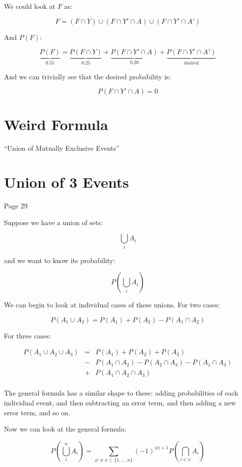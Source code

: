 \documentclass{article}
\begin{document}
We could look at $F$ as:

\[
F=(F\cap Y)\cup(F\cap Y'\cap A)\cup(F\cap Y'\cap A')
\]

And $P(F)$:

\[
\underbrace{P(F)}_{0.55}=\underbrace{P(F\cap Y)}_{0.25}+\underbrace{P(F\cap Y'\cap A)}_{0.20}+\underbrace{P(F\cap Y'\cap A')}_{\text{desired}}
\]

And we can trivially see that the desired probability is:

\[
P(F\cap Y'\cap A) = 0
\]

\section*{Weird Formula}

``Union of Mutually Exclusive Events''

\section*{Union of 3 Events}

Page 29

Suppose we have a union of sets:

\[
\bigcup\limits_i A_i
\]

and we want to know its probability:

\[
P\left(\bigcup\limits_i A_i\right)
\]

We can begin to look at individual cases of these unions. For two
cases:

\[
P(A_1\cup A_2) = P(A_1)+P(A_2)-P(A_1\cap A_2)
\]

For three cases:

\[
\begin{array}{rcl}
P(A_1\cup A_2\cup A_3) & = & P(A_1) + P(A_2) + P(A_3) \\
                       & - & P(A_1\cap A_2) - P(A_2\cap A_3) - P(A_1\cap A_3) \\
                       & + & P(A_1\cap A_2\cap A_3) \\
\end{array}
\]

The general formula has a similar shape to these: adding probabilities
of each individual event, and then subtracting an error term, and then
adding a new error term, and so on.

Now we can look at the general formula:

\[
P\left(\bigcup\limits_i^n A_i\right)
=
\sum\limits_{\varnothing\ne x\subset\{1,\dots,n\}}
(-1)^{|x|+1}
P\left(\bigcap\limits_{i\in x} A_i\right)
\]
\end{document}
